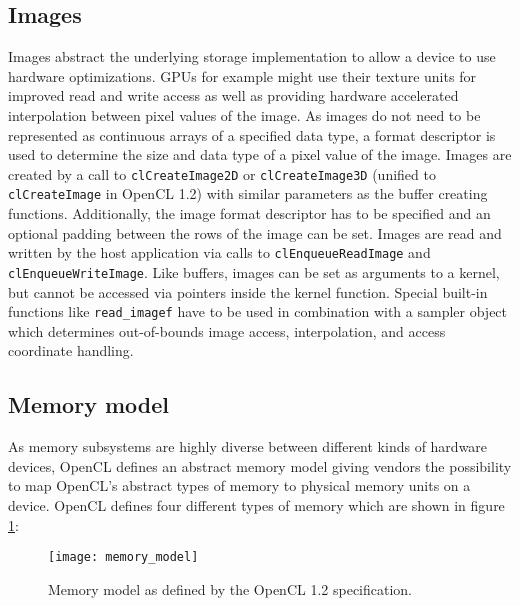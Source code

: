 \subsection{Images}
\label{sec:images}
Images abstract the underlying storage implementation to allow a device to use hardware optimizations. GPUs for example might use their texture units for improved read and write access as well as providing hardware accelerated interpolation between pixel values of the image. As images do not need to be represented as continuous arrays of a specified data type, a format descriptor is used to determine the size and data type of a pixel value of the image. Images are created by a call to \lstinline!clCreateImage2D! or \lstinline!clCreateImage3D! (unified to \lstinline!clCreateImage! in OpenCL 1.2) with similar parameters as the buffer creating functions. Additionally, the image format descriptor has to be specified and an optional padding between the rows of the image can be set. Images are read and written by the host application via calls to \lstinline!clEnqueueReadImage! and \lstinline!clEnqueueWriteImage!. Like buffers, images can be set as arguments to a kernel, but cannot be accessed via pointers inside the kernel function. Special built-in functions like \lstinline!read_imagef! have to be used in combination with a sampler object which determines out-of-bounds image access, interpolation, and access coordinate handling. \cite[p.25f]{opencl_book}

\subsection{Memory model}
As memory subsystems are highly diverse between different kinds of hardware devices, OpenCL defines an abstract memory model giving vendors the possibility to map OpenCL's abstract types of memory to physical memory units on a device.
OpenCL defines four different types of memory which are shown in figure \ref{fig:memory_model}:

\begin{figure} 
\centering
\texttt{[image: memory\_model]}
\caption{Memory model as defined by the OpenCL 1.2 specification.\cite{opencl_spec}}
\label{fig:memory_model}
\end{figure}

